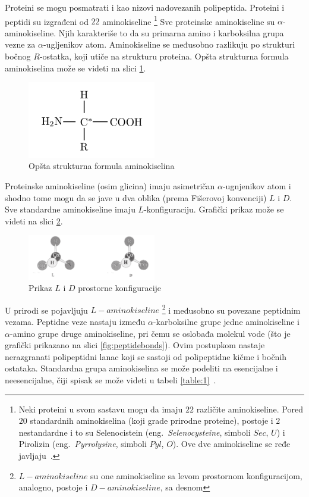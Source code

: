 Proteini se mogu posmatrati i kao nizovi nadovezanih polipeptida.
Proteini i peptidi su izgrađeni od $22$ aminokiseline \footnote{Neki proteini u svom sastavu mogu da imaju $22$ različite aminokiseline. Pored $20$ standardnih aminokiselina (koji grade prirodne proteine), postoje i $2$ nestandardne i to su Selenocistein (eng.~{\em Selenocysteine}, simboli $Sec$, $U$) i Pirolizin (eng.~{\em Pyrrolysine},
simboli $Pyl$, $O$). Ove dve aminokiseline se ređe javljaju~\cite{MarijaJ}.}
Sve proteinske aminokiseline su $\alpha$-aminokiseline. Njih karakteriše to da su primarna amino i karboksilna grupa vezne za $\alpha$-ugljenikov atom. Aminokiseline se međusobno razlikuju po strukturi bočnog $R$-ostatka, koji utiče na strukturu proteina. Opšta strukturna formula aminokiselina može se videti na slici \ref{fig:aminokiselina}. %
\begin{figure}[h]
	\centering
    \includegraphics[width=0.5\textwidth]{Figures/BO/aminokiselina.png}
    \caption{Opšta strukturna formula aminokiselina ~\cite{Principi}}
    \label{fig:aminokiselina}
\end{figure}
Proteinske aminokiseline (osim glicina) imaju asimetričan $\alpha$-ugnjenikov atom i shodno tome mogu da se jave u dva oblika (prema Fišerovoj konvenciji) $L$ i $D$. Sve standardne aminokiseline imaju $L$-konfiguraciju. Grafički prikaz može se videti na slici \ref{fig:LDkonfig}.
\begin{figure}[H]
	\centering
    \includegraphics[width=0.5\textwidth]{Figures/BO/LDkonfig.png}
    \caption{Prikaz $L$ i $D$ prostorne konfiguracije ~\cite{Principi}}
    \label{fig:LDkonfig}
\end{figure}
U prirodi se pojavljuju $L-aminokiseline$ \footnote{$L-aminokiseline$ su one aminokiseline sa levom prostornom konfiguracijom, analogno, postoje i $D-aminokiseline$, sa desnom} i međusobno su povezane peptidnim vezama. Peptidne veze nastaju između $\alpha$-karboksilne grupe jedne aminokiseline i $\alpha$-amino grupe druge aminokiseline, pri čemu se oslobađa molekul vode (što je grafički prikazano na slici \ref{fig:peptidebonds}). Ovim postupkom nastaje nerazgranati polipeptidni lanac koji se sastoji od polipeptidne kičme i bočnih ostataka. Standardna grupa aminokiselina se može podeliti na esencijalne i
neesencijalne, čiji spisak se može videti u tabeli \ref{table:1}~\cite{MarijaJ,biopathways}.\\ 


